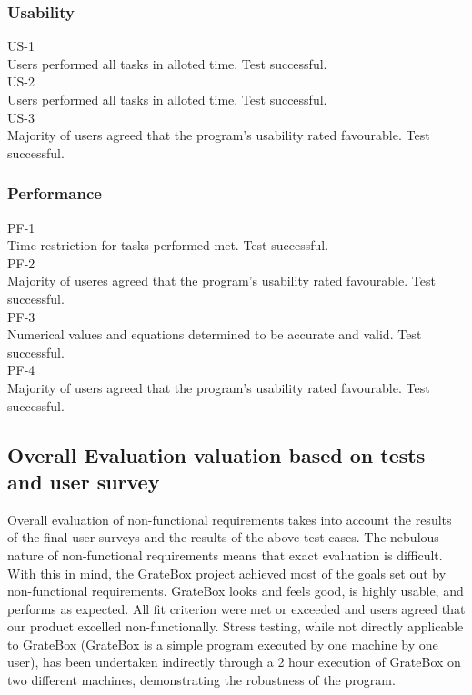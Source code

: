 \documentclass[12pt, titlepage]{article}
\begin{document}
\subsubsection{Usability}

US-1\\

Users performed all tasks in alloted time. Test successful.\\

US-2\\

Users performed all tasks in alloted time. Test successful.\\

US-3\\

Majority of users agreed that the program's usability rated favourable. Test successful.

\subsubsection{Performance}

PF-1\\

Time restriction for tasks performed met. Test successful.\\

PF-2\\

Majority of useres agreed that the program's usability rated favourable. Test successful.\\

PF-3\\

Numerical values and equations determined to be accurate and valid. Test successful.\\

PF-4\\

Majority of users agreed that the program's usability rated favourable. Test successful.

\subsection{Overall Evaluation valuation based on tests and user survey}

Overall evaluation of non-functional requirements takes into account the results of the final user surveys and the results of the above test cases. The nebulous nature of non-functional requirements means that exact evaluation is difficult. With this in mind, the GrateBox project achieved most of the goals set out by non-functional requirements. GrateBox looks and feels good, is highly usable, and performs as expected. All fit criterion were met or exceeded and users agreed that our product excelled non-functionally. Stress testing, while not directly applicable to GrateBox (GrateBox is a simple program executed by one machine by one user), has been undertaken indirectly through a 2 hour execution of GrateBox on two different machines, demonstrating the robustness of the program.
\end{document}
